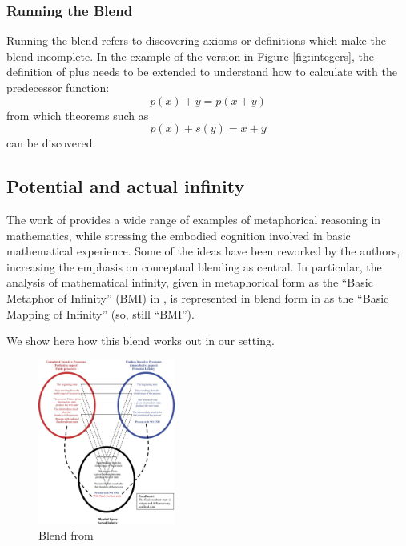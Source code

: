 \subsubsection{Running the Blend}

Running the blend refers to discovering axioms or definitions which
make the blend incomplete. In the example of the version in Figure
\ref{fig:integers}, the definition of plus needs to be extended to
understand how to calculate with the predecessor function:
$$
p(x) + y = p(x+y)
$$
\noindent from which theorems such as 
$$
p(x) + s(y) = x+y
$$
\noindent can be discovered.


\subsection{Potential and actual infinity}

The work of \textcite{Lak00} provides a wide range of examples of
metaphorical reasoning in mathematics, while stressing the embodied
cognition involved in basic mathematical experience.  Some of
the ideas have been reworked by the authors, increasing the emphasis on
conceptual blending as central.  In particular, the analysis of
mathematical infinity, given in metaphorical form as the ``Basic Metaphor
of Infinity'' (BMI) in \textcite{Lak00}, is represented in blend form
in \textcite{nunez05} as the ``Basic Mapping of Infinity'' (so, still ``BMI'').

We show here how this blend works out in our setting.

\begin{figure}[h]
  \centering
\includegraphics[width=0.4\textwidth]{transfin_nunez}  
  \caption{Blend from \textcite[p.\ 1730]{nunez05}}
  \label{fig:nunez_transfin}
\end{figure}

